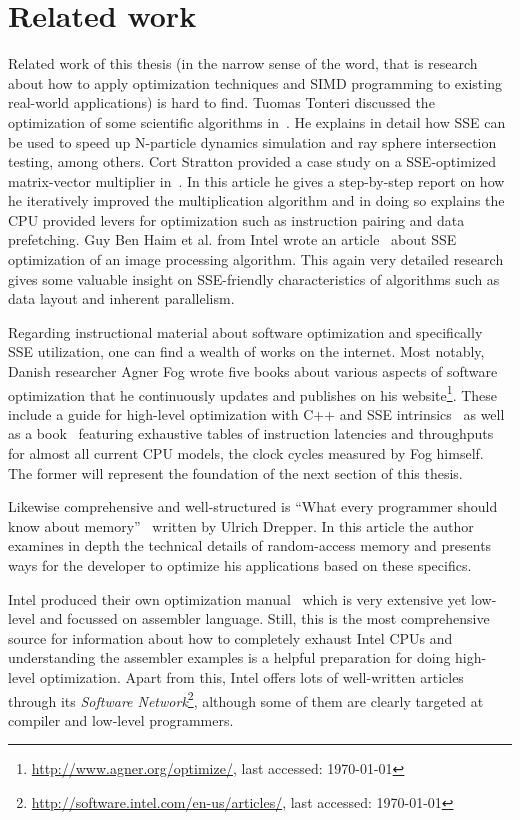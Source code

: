 \section{Related work}
\label{Related_work}

Related work of this thesis (in the narrow sense of the word, that is research about how to apply optimization techniques and SIMD programming to existing real-world applications) is hard to find. Tuomas Tonteri discussed the optimization of some scientific algorithms in~\cite{tonteri2012}. He explains in detail how SSE can be used to speed up N-particle dynamics simulation and ray sphere intersection testing, among others. Cort Stratton provided a case study on a SSE-optimized matrix-vector multiplier in~\cite{stratton2002}. In this article he gives a step-by-step report on how he iteratively improved the multiplication algorithm and in doing so explains the CPU provided levers for optimization such as instruction pairing and data prefetching. Guy Ben Haim et al. from Intel wrote an article~\cite{haim2009} about SSE optimization of an image processing algorithm. This again very detailed research gives some valuable insight on SSE-friendly characteristics of algorithms such as data layout and inherent parallelism.

Regarding instructional material about software optimization and specifically SSE utilization, one can find a wealth of works on the internet. Most notably, Danish researcher Agner Fog wrote five books about various aspects of software optimization that he continuously updates and publishes on his website\footnote{\url{http://www.agner.org/optimize/}, last accessed: \today{}}. These include a guide for high-level optimization with C++ and SSE intrinsics~\cite{fog2011optimizing} as well as a book~\cite{fog2011instructiontables} featuring exhaustive tables of instruction latencies and throughputs for almost all current CPU models, the clock cycles measured by Fog himself. The former will represent the foundation of the next section of this thesis.

Likewise comprehensive and well-structured is ``What every programmer should know about memory''~\cite{drepper2007memory} written by Ulrich Drepper. In this article the author examines in depth the technical details of random-access memory and presents ways for the developer to optimize his applications based on these specifics.

Intel produced their own optimization manual~\cite{intel2011manual} which is very extensive yet low-level and focussed on assembler language. Still, this is the most comprehensive source for information about how to completely exhaust Intel CPUs and understanding the assembler examples is a helpful preparation for doing high-level optimization. Apart from this, Intel offers lots of well-written articles through its \emph{Software Network}\footnote{\url{http://software.intel.com/en-us/articles/}, last accessed: \today{}}, although some of them are clearly targeted at compiler and low-level programmers.

